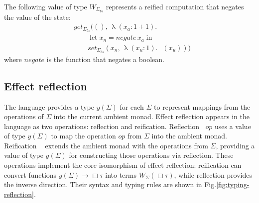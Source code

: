 \documentclass[acmsmall, screen, review, anonymous]{acmart}
\theoremstyle{definition}
\newcommand{\glob}{\mathop{\Box}}
\newcommand{\yoneda}[1]{y(#1)}
\newcommand{\reflectname}{\Uparrow}
\newcommand{\reflectraw}[1]{\mathop{\reflectname_{#1}}}
\newcommand{\reifyname}{\Downarrow}
\newcommand{\reifyraw}[1]{\mathop{\reifyname_{#1}}}
\newcommand{\ind}[1]{W_{#1}}
\newcommand{\indintro}[4]{#2_{#1}(#3,\, #4)}
\newcommand{\retname}{\mathrm{ret}}
\newcommand{\ret}[2]{\mathop{\retname_{#1}}(#2)}
\newcommand{\abs}[3]{\mathop{\lambda}(#1 \types #2).\,#3}
\newcommand{\app}[2]{#1\,#2}
\newcommand{\types}{\mathrel{:}}
\newcommand{\letv}[3]{\mathop{\mathrm{let}} #1 = #2 \mathop{\mathrm{in}} #3}
\begin{document}
\begin{example}
  \label{example:negate}
  The following value of type $\ind{\Sigma_{bs}}$ represents a
  reified computation that negates the value of the state:
  \begin{align*}
    &\indintro{\Sigma_{bs}}{get}{()}{\abs{x_a}{1 + 1}{\\
        &\qquad \letv{x_n}{\app{\mathit{negate}}{x_a}}{\\
          &\qquad \indintro{\Sigma_{bs}}{set}{x_n}{\abs{x_u}{1}{\ret{\Sigma_{bs}}{x_u}}}}}}
  \end{align*}
  where $\mathit{negate}$ is the function that negates a boolean.
\end{example}

\subsection{Effect reflection}

The language provides a type $\yoneda{\Sigma}$ for each $\Sigma$ to
represent mappings from the operations of $\Sigma$ into the current
ambient monad. Effect reflection appears in the language as two
operations: reflection and reification. Reflection
$\reflectraw{\Sigma}{op}$ uses a value of type $\yoneda{\Sigma}$ to map
the operation $op$ from $\Sigma$ into the ambient monad.  Reification
$\reifyraw{\Sigma}$ extends the ambient monad with the operations from
$\Sigma$, providing a value of type $\yoneda{\Sigma}$ for constructing
those operations via reflection.  These operations implement the core
isomorphism of effect reflection: reification can convert functions
$\yoneda{\Sigma} \rightarrow \glob \tau$ into terms $\ind{\Sigma}(\glob
\tau)$, while reflection provides the inverse direction. Their syntax
and typing rules are shown in Fig.\ref{fig:typing-reflection}.
\end{document}
